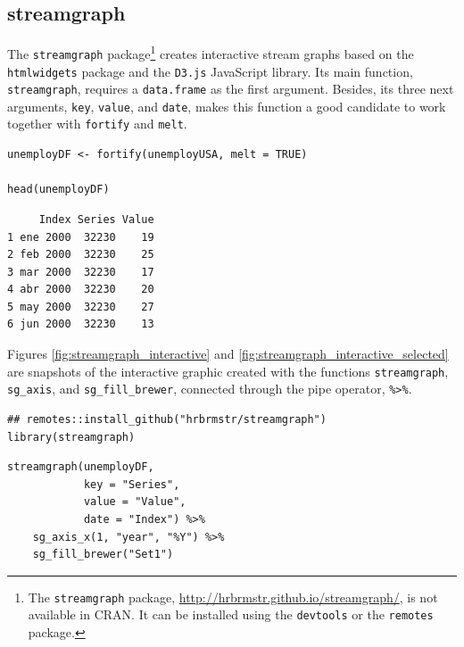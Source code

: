 \subsection{streamgraph \label{sec:interactive_streamgraph}}
\label{sec:org4c393ce}

The \texttt{streamgraph} package\footnote{The \texttt{streamgraph} package, \url{http://hrbrmstr.github.io/streamgraph/}, is not available in CRAN. It can be installed using the \texttt{devtools} or the \texttt{remotes} package.} creates interactive stream graphs based on
the \texttt{htmlwidgets} package and the \texttt{D3.js} JavaScript library. Its main
function, \texttt{streamgraph}, requires a \texttt{data.frame} as the first
argument. Besides, its three next arguments, \texttt{key}, \texttt{value}, and
\texttt{date}, makes this function a good candidate to work together with
\texttt{fortify} and \texttt{melt}.


\lstset{language=r,label= ,caption= ,captionpos=b,numbers=none}
\begin{lstlisting}
unemployDF <- fortify(unemployUSA, melt = TRUE)

head(unemployDF)
\end{lstlisting}

\begin{verbatim}
     Index Series Value
1 ene 2000  32230    19
2 feb 2000  32230    25
3 mar 2000  32230    17
4 abr 2000  32230    20
5 may 2000  32230    27
6 jun 2000  32230    13
\end{verbatim}

Figures \ref{fig:streamgraph_interactive} and
\ref{fig:streamgraph_interactive_selected} are snapshots of the
interactive graphic created with the functions \texttt{streamgraph},
\texttt{sg\_axis}, and \texttt{sg\_fill\_brewer}, connected through the pipe operator,
\texttt{\%>\%}.


\lstset{language=r,label= ,caption= ,captionpos=b,numbers=none}
\begin{lstlisting}
## remotes::install_github("hrbrmstr/streamgraph")
library(streamgraph)
\end{lstlisting}

\lstset{language=r,label= ,caption= ,captionpos=b,numbers=none}
\begin{lstlisting}
streamgraph(unemployDF,
            key = "Series",
            value = "Value",
            date = "Index") %>%
    sg_axis_x(1, "year", "%Y") %>%
    sg_fill_brewer("Set1")
\end{lstlisting}

